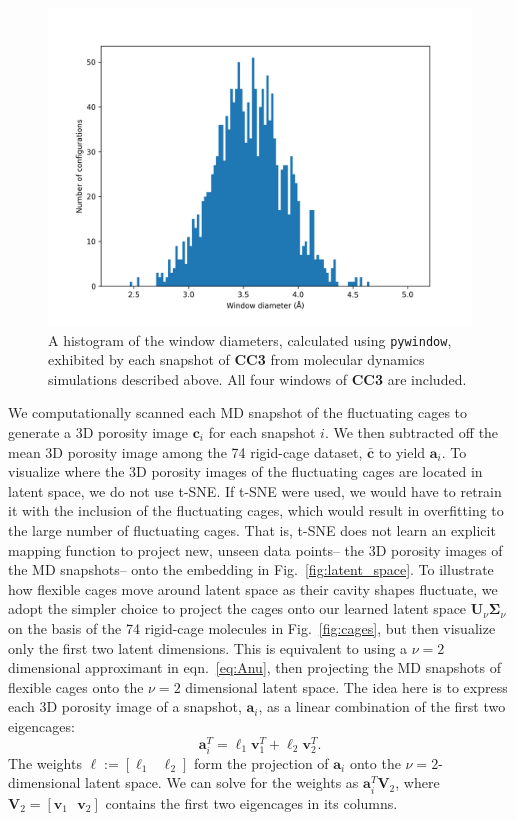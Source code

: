 \documentclass[journal=jacsat,manuscript=article]{achemso}
\begin{document}
\begin{figure}
\centering
	\includegraphics[width=0.65\columnwidth]{../cc3_histogram.png}
	\caption{A histogram of the window diameters, calculated using \texttt{pywindow}, exhibited by each snapshot of \textbf{CC3} from molecular dynamics simulations described above. All four windows of \textbf{CC3} are included.
	} \label{fig:window_diameter_hist}
\end{figure}

We computationally scanned each MD snapshot of the fluctuating cages to generate a 3D porosity image $\mathbf{c}_i$ for each snapshot $i$. We then subtracted off the mean 3D porosity image among the 74 rigid-cage dataset, $\bar{\mathbf{c}}$ to yield $\mathbf{a}_i$.
To visualize where the 3D porosity images of the fluctuating cages are located in latent space, we do not use t-SNE. If t-SNE were used, we would have to retrain it with the inclusion of the fluctuating cages, which would result in overfitting to the large number of fluctuating cages. That is, t-SNE does not learn an explicit mapping function to project new, unseen data points-- the 3D porosity images of the MD snapshots-- onto the embedding in Fig.~\ref{fig:latent_space}. To illustrate how flexible cages move around latent space as their cavity shapes fluctuate, we adopt the simpler choice to project the cages onto our learned latent space $\mathbf{U}_\nu \mathbf{\Sigma}_\nu$ on the basis of the 74 rigid-cage molecules in Fig.~\ref{fig:cages}, but then visualize only the first two latent dimensions. This is equivalent to using a $\nu=2$ dimensional approximant in eqn.~\ref{eq:Anu}, then projecting the MD snapshots of flexible cages onto the $\nu=2$ dimensional latent space. 
The idea here is to express each 3D porosity image of a snapshot, $\mathbf{a}_i$, as a linear combination of the first two eigencages:
\begin{equation}
\mathbf{a}_i^T = \ell_1 \mathbf{v}_1^T + \ell_2 \mathbf{v}_2^T.
\end{equation} The weights $\boldsymbol \ell:=[\ell_1 \text{ } \ell_2]$ form the projection of $\mathbf{a}_i$ onto the $\nu=2$-dimensional latent space. We can solve for the weights as $\mathbf{a}_i^T \mathbf{V}_2$, where $\mathbf{V}_2 = [\mathbf{v}_1 \text{ } \mathbf{v}_2]$ contains the first two eigencages in its columns.
\end{document}
